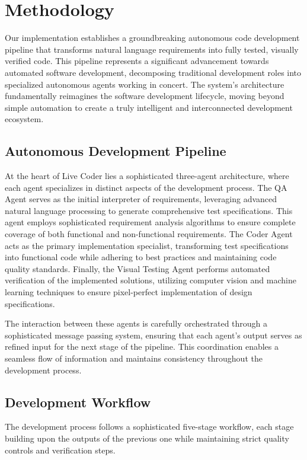 \documentclass{lxaiproposal}
\begin{document}
\section{Methodology}
Our implementation establishes a groundbreaking autonomous code development pipeline that transforms natural language requirements into fully tested, visually verified code. This pipeline represents a significant advancement towards automated software development, decomposing traditional development roles into specialized autonomous agents working in concert. The system's architecture fundamentally reimagines the software development lifecycle, moving beyond simple automation to create a truly intelligent and interconnected development ecosystem.

\subsection{Autonomous Development Pipeline}
At the heart of Live Coder lies a sophisticated three-agent architecture, where each agent specializes in distinct aspects of the development process. The QA Agent serves as the initial interpreter of requirements, leveraging advanced natural language processing to generate comprehensive test specifications. This agent employs sophisticated requirement analysis algorithms to ensure complete coverage of both functional and non-functional requirements. The Coder Agent acts as the primary implementation specialist, transforming test specifications into functional code while adhering to best practices and maintaining code quality standards. Finally, the Visual Testing Agent performs automated verification of the implemented solutions, utilizing computer vision and machine learning techniques to ensure pixel-perfect implementation of design specifications.

The interaction between these agents is carefully orchestrated through a sophisticated message passing system, ensuring that each agent's output serves as refined input for the next stage of the pipeline. This coordination enables a seamless flow of information and maintains consistency throughout the development process.

\subsection{Development Workflow}
The development process follows a sophisticated five-stage workflow, each stage building upon the outputs of the previous one while maintaining strict quality controls and verification steps.
\end{document}
